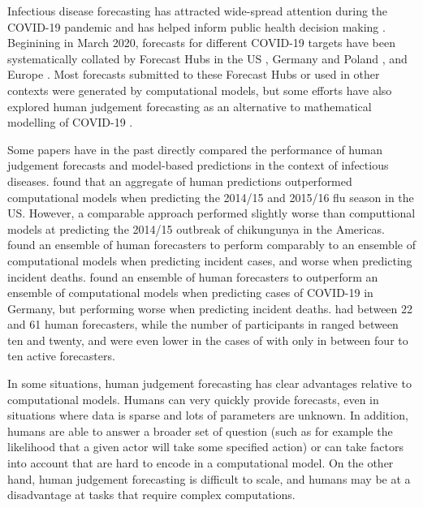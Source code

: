 \documentclass[10pt,a4paper,twocolumn]{article}
\begin{document}
Infectious disease forecasting has attracted wide-spread attention during the COVID-19 pandemic and has helped inform public health decision making \cite{cramerEvaluationIndividualEnsemble2021, venkatramananUtilityHumanJudgment2022}. Beginining in March 2020, forecasts for different COVID-19 targets have been systematically collated by Forecast Hubs in the US \citep{cramerEvaluationIndividualEnsemble2021}, Germany and Poland \citep{bracherShorttermForecastingCOVID192021, bracherNationalSubnationalShortterm2021}, and Europe \citep{sherrattPredictivePerformanceMultimodel2022a}. Most forecasts submitted to these Forecast Hubs or used in other contexts were generated by computational models, but some efforts have also explored human judgement forecasting as an alternative to mathematical modelling of COVID-19 \cite{recchiaHowWellDid2021, mcandrewExpertJudgmentModel2022, bosseComparingHumanModelbased2022, mcandrewChimericForecastingCombining2022}. 

Some papers have in the past directly compared the performance of human judgement forecasts and model-based predictions in the context of infectious diseases. \cite{farrowHumanJudgmentApproach2017} found that an aggregate of human predictions outperformed computational models when predicting the 2014/15 and 2015/16 flu season in the US. However, a comparable approach performed slightly worse than computtional models at predicting the 2014/15 outbreak of chikungunya in the Americas. \cite{mcandrewChimericForecastingCombining2022} found an ensemble of human forecasters to perform comparably to an ensemble of computational models when predicting incident cases, and worse when predicting incident deaths. \cite{bosseComparingHumanModelbased2022} found an ensemble of human forecasters to outperform an ensemble of computational models when predicting cases of COVID-19 in Germany, but performing worse when predicting incident deaths. \cite{mcandrewChimericForecastingCombining2022} had between 22 and 61 human forecasters, while the number of participants in \cite{farrowHumanJudgmentApproach2017} ranged between ten and twenty, and were even lower in the cases of \cite{bosseComparingHumanModelbased2022} with only in between four to ten active forecasters. 

In some situations, human judgement forecasting has clear advantages relative to computational models. Humans can very quickly provide forecasts, even in situations where data is sparse and lots of parameters are unknown. In addition, humans are able to answer a broader set of question (such as for example the likelihood that a given actor will take some specified action) or can take factors into account that are hard to encode in a computational model. On the other hand, human judgement forecasting is difficult to scale, and humans may be at a disadvantage at tasks that require complex computations. 
\end{document}
